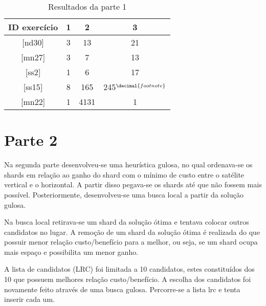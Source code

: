 \documentclass[11pt,letterpaper]{article}
\begin{document}
\begin{table}[h!]
\begin{centering}
\begin{tabular}{|c|c|c|c|}
\hline 
ID exercício & 1 & 2 & 3\tabularnewline
\hline 
\hline 
{[}nd30{]}  & 3 & 13  & 21 \tabularnewline
\hline 
 {[}mn27{]} & 3 & 7 & 13 \tabularnewline
\hline 
 {[}ss2{]} & 1 & 6  & 17 \tabularnewline
\hline 
{[}ss15{]} & 8 & 165  & 245$^{\decimal{footnote}}$\addtocounter{footnote}{1}  \tabularnewline
\hline 
 {[}mn22{]} & 1 & 4131  & 1 \tabularnewline
\hline 
\end{tabular}
\par\end{centering}
\caption{Resultados da parte 1}
\end{table}

\addtocounter{footnote}{-1} 
\section{Parte 2}

Na segunda parte desenvolveu-se uma heurística gulosa, no qual
ordenava-se os shards em relação ao ganho do shard com o mínimo de
custo entre o satélite vertical e o horizontal.
A partir disso pegava-se os shards até que não fossem mais possível.
Posteriormente, desenvolveu-se uma busca local a partir da solução
gulosa.

Na busca local retirava-se um shard da solução ótima e tentava colocar
outros candidatos no lugar. A remoção de um shard da solução ótima é realizada do que possuir
menor relação custo/benefício para a melhor, ou seja, se um shard
ocupa mais espaço e possibilita um menor ganho.

A lista de candidatos (LRC) foi limitada a 10 candidatos, estes
constituídos dos 10 que possuem melhores relação custo/benefício.
A escolha dos candidatos foi novamente feito através de uma busca
gulosa. Percorre-se a lista lrc e tenta inserir cada um.
\end{document}

